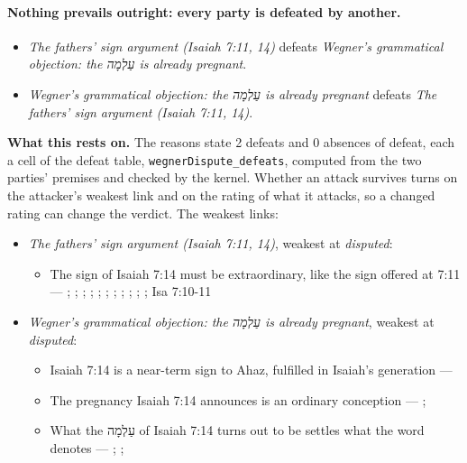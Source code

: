 \documentclass[11pt]{article}
\begin{document}
\paragraph{Nothing prevails outright: every party is defeated by another.}
\begin{itemize}
\item \emph{The fathers’ sign argument (Isaiah 7:11, 14)} defeats \emph{Wegner’s grammatical objection: the עַלְמָה is already pregnant}.
\item \emph{Wegner’s grammatical objection: the עַלְמָה is already pregnant} defeats \emph{The fathers’ sign argument (Isaiah 7:11, 14)}.
\end{itemize}
\par\noindent\textbf{What this rests on.} The reasons state 2 defeats and 0 absences of defeat, each a cell of the defeat table, \texttt{wegner\allowbreak{}Dispute\_\allowbreak{}defeats}, computed from the two parties' premises and checked by the kernel. Whether an attack survives turns on the attacker's weakest link and on the rating of what it attacks, so a changed rating can change the verdict. The weakest links:
\begin{itemize}
\item \emph{The fathers’ sign argument (Isaiah 7:11, 14)}, weakest at \emph{disputed}:
\begin{itemize}
\item The sign of Isaiah 7:14 must be extraordinary, like the sign offered at 7:11 --- \cite[I.35]{origen-against-celsus-248}; \cite[84]{justin-dialogue-with-trypho-160}; \cite[III.21.6]{irenaeus-against-heresies-180}; \cite[9]{tertullian-answer-to-the-jews-200}; \cite[VII.1]{eusebius-demonstratio-evangelica-315}; \cite[12.22]{cyril-jerusalem-catechetical-lectures-350}; \cite[5]{chrysostom-homilies-matthew-390}; \cite[ad loc. Isa 7:14]{jerome-commentary-isaiah-410}; \cite[ad loc. Isa 7:14]{cyril-alexandria-commentary-isaiah}; \cite[ad loc. Isa 7:14]{theodoret-commentary-isaiah}; \cite[474]{postell-isaiah-messianic-2025}; Isa 7:10-11
\end{itemize}
\item \emph{Wegner’s grammatical objection: the עַלְמָה is already pregnant}, weakest at \emph{disputed}:
\begin{itemize}
\item Isaiah 7:14 is a near-term sign to Ahaz, fulfilled in Isaiah’s generation --- \cite{brown-birth-messiah-1993}
\item The pregnancy Isaiah 7:14 announces is an ordinary conception --- \cite[476--478]{wegner-virgin-births-2011}; \cite[474]{postell-isaiah-messianic-2025}
\item What the עַלְמָה of Isaiah 7:14 turns out to be settles what the word denotes --- \cite[471--472]{wegner-virgin-births-2011}; \cite[468]{postell-isaiah-messianic-2025}; \cite[152]{rico-gentry-infant-king-2020}
\end{itemize}
\end{itemize}
\end{document}
